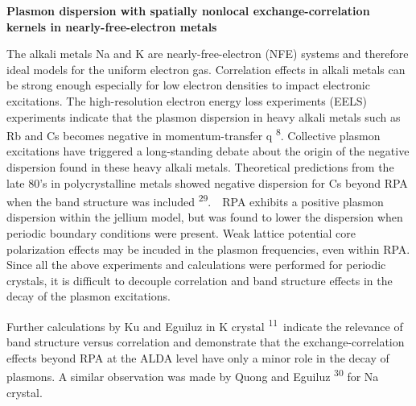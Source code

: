 \documentclass[12pt]{article}
\renewcommand{\_}{\kern-1.5pt\textunderscore\kern-1.5pt}
\begin{document}
\vspace{\baselineskip}
\setlength{\parskip}{9.96pt}

\vspace{\baselineskip}
\setlength{\parskip}{0.0pt}
\setlength{\parskip}{9.96pt}
\setlength{\parskip}{0.0pt}
\begin{justify}
\textbf{Plasmon dispersion with spatially nonlocal exchange-correlation kernels in nearly-free-electron metals}
\end{justify}\par


\vspace{\baselineskip}
\setlength{\parskip}{9.96pt}

\vspace{\baselineskip}
\setlength{\parskip}{0.0pt}
\setlength{\parskip}{9.96pt}
\setlength{\parskip}{0.0pt}
\begin{justify}
The alkali metals Na and K are nearly-free-electron (NFE) systems and therefore ideal models for the uniform electron gas. Correlation effects in alkali metals can be strong enough especially for low electron densities to impact electronic excitations. The high-resolution electron energy loss experiments (EELS) experiments indicate that the plasmon dispersion in heavy alkali metals such as Rb and Cs becomes negative in momentum-transfer q \textsuperscript{8}. Collective plasmon excitations have triggered a long-standing debate about the origin of the negative dispersion found in these heavy alkali metals. Theoretical predictions from the late 80’s in polycrystalline metals showed negative dispersion for Cs beyond RPA when the band structure was included \textsuperscript{29}.\ \ RPA exhibits a positive plasmon dispersion within the jellium model, but was found to lower the dispersion when periodic boundary conditions were present.  Weak lattice potential core polarization effects may be incuded in the plasmon frequencies, even within RPA. Since all the above experiments and calculations were performed for periodic crystals, it is difficult to decouple correlation and band structure effects in the decay of the plasmon excitations.
\end{justify}\par

\begin{justify}
Further calculations by Ku and Eguiluz in K crystal \textsuperscript{11}\ indicate the relevance of band structure versus correlation and demonstrate that the exchange-correlation effects beyond RPA at the ALDA level have only a minor role in the decay of plasmons. A similar observation was made by Quong and Eguiluz  \textsuperscript{30} for Na crystal.
\end{justify}\par
\end{document}
